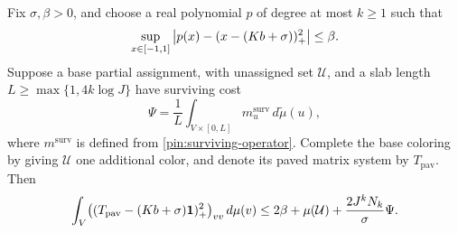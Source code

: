 \begin{lemma}\label{lem:descent}
Fix $\sigma,\beta>0$, and choose a real polynomial $p$ of degree at most
$k\geq1$ such that
\[
 \sup_{x\in[-1,1]}
 \left|p(x)-(x-(Kb+\sigma))_+^2\right|\leq\beta.
\]
Suppose a base partial assignment, with unassigned set $\mathcal U$,
and a slab length $L\geq\max\{1,4k\log J\}$ have surviving cost
\[
 \Psi=\frac1L\int_{V\times[0,L]}m_u^{\mathrm{surv}}\,
                         d\widetilde\mu(u),
\]
where $m^{\mathrm{surv}}$ is defined from
\eqref{pin:surviving-operator}.  Complete the base coloring by giving
$\mathcal U$ one additional color, and denote its paved matrix system
by $T_{\mathrm{pav}}$.  Then
\begin{equation}\label{pin:descent-bound}
 \int_V\bigl((T_{\mathrm{pav}}-(Kb+\sigma)\mathbf 1)_+^2\bigr)_{vv}
                   \,d\mu(v)
 \leq2\beta+\mu(\mathcal U)+\frac{2J^kN_k}{\sigma}\Psi.
\end{equation}
\end{lemma}


